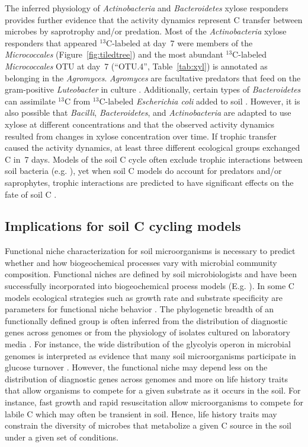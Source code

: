 The inferred physiology of \textit{Actinobacteria} and \textit{Bacteroidetes}
xylose responders provides further evidence that the activity dynamics
represent C transfer between microbes by saprotrophy and/or predation. Most of
the \textit{Actinobacteria} xylose responders that appeared $^{13}$C-labeled at
day~7 were members of the \textit{Micrococcales} (Figure~\ref{fig:tiledtree})
and the most abundant $^{13}$C-labeled \textit{Micrococcales} OTU at day~7
(“OTU.4”, Table~\ref{tab:xyl}) is annotated as belonging in the
\textit{Agromyces}. \textit{Agromyces} are facultative predators that feed on
the gram-positive \textit{Luteobacter} in culture \citep{16346402}.
Additionally, certain types of \textit{Bacteroidetes} can assimilate $^{13}$C
from $^{13}$C-labeled \textit{Escherichia coli} added to soil
\citep{Lueders2006}. However, it is also possible that \textit{Bacilli},
\textit{Bacteroidetes}, and \textit{Actinobacteria} are adapted to use xylose
at different concentrations and that the observed activity dynamics resulted
from changes in xylose concentration over time. If trophic transfer caused the
activity dynamics, at least three different ecological groups exchanged C in~7
days. Models of the soil C cycle often exclude trophic interactions between
soil bacteria (e.g. \citep{Moore1988}), yet when soil C models do account for
predators and/or saprophytes, trophic interactions are predicted to have
significant effects on the fate of soil C \citep{Kaiser2014a}. 

\subsection{Implications for soil C cycling models}
Functional niche characterization for soil microorganisms is necessary to
predict whether and how biogeochemical processes vary with microbial community
composition. Functional niches are defined by soil microbiologists and have
been successfully incorporated into biogeochemical process models (E.g.
\citep{wieder_2014a,Kaiser2014a}). In some C models ecological strategies such
as growth rate and substrate specificity are parameters for functional niche
behavior \citep{Kaiser2014a}. The phylogenetic breadth of an functionally
defined group is often inferred from the distribution of diagnostic genes
across genomes \citep{Berlemont2013} or from the physiology of isolates
cultured on laboratory media \citep{Martiny2013}. For instance, the wide
distribution of the glycolyis operon in microbial genomes is interpreted as
evidence that many soil microorganisms participate in glucose turnover
\citep{McGuire2010}. However, the functional niche may depend less on the
distribution of diagnostic genes across genomes and more on life history traits
that allow organisms to compete for a given substrate as it occurs in the soil.
For instance, fast growth and rapid resuscitation allow microorganisms to
compete for labile C which may often be transient in soil. Hence, life history
traits may constrain the diversity of microbes that metabolize a given C source
in the soil under a given set of conditions.

